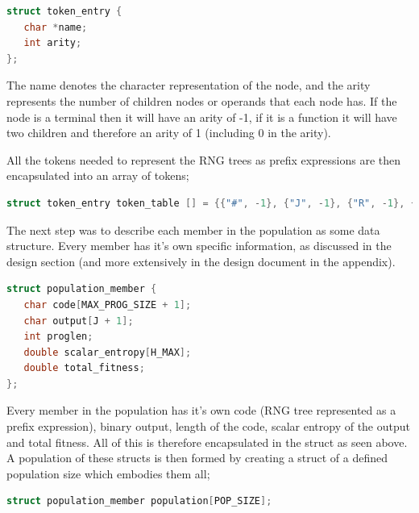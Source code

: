 \documentclass[a4paper,10.5pt]{article}
\begin{document}
\begin{lstlisting}[language=C]
struct token_entry {
   char *name;
   int arity;
};
\end{lstlisting}

The name denotes the character representation of the node, and the arity represents the number of children nodes or operands that each node has. If the node is a terminal then it will have an arity of -1, if it is a function it will have two children and therefore an arity of 1 (including 0 in the arity).

All the tokens needed to represent the RNG trees as prefix expressions are then encapsulated into an array of tokens;
\begin{lstlisting}[language=C]
struct token_entry token_table [] = {{"#", -1}, {"J", -1}, {"R", -1}, {"+", 1}, {"-", 1}, {"*", 1}, {"%", 1}, {"/", 1}, {"0", -1}, {"1", -1}, {"2", -1}, {"3", -1} };
\end{lstlisting}

The next step was to describe each member in the population as some data structure. Every member has it's own specific information, as discussed in the design section (and more extensively in the design document in the appendix).

\begin{lstlisting}[language=C]
struct population_member {
   char code[MAX_PROG_SIZE + 1];
   char output[J + 1];
   int proglen;
   double scalar_entropy[H_MAX];
   double total_fitness;
};
\end{lstlisting}

Every member in the population has it's own code (RNG tree represented as a prefix expression), binary output, length of the code, scalar entropy of the output and total fitness. All of this is therefore encapsulated in the struct as seen above. A population of these structs is then formed by creating a struct of a defined population size which embodies them all;

\begin{lstlisting}[language=C]
struct population_member population[POP_SIZE];
\end{lstlisting}
\end{document}
